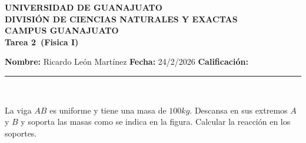 \documentclass[12pt,a4paper]{article}
\newcommand{\alumno}{Ricardo León Martínez}
\newcommand{\materia}{Fisica I}
\newcommand{\tarea}{Tarea 2}
\newcommand{\fecha}{24/2/2026}
\begin{document}
    \begin{center}
    {\large\textbf{UNIVERSIDAD DE GUANAJUATO}}\\[0.3cm]
    {\normalsize\textbf{DIVISIÓN DE CIENCIAS NATURALES Y EXACTAS}}\\
    {\normalsize\textbf{CAMPUS GUANAJUATO}}\\[1cm]

    {\Large\textbf{\tarea\ (\materia)}}\\[1cm]
    \end{center}

    \textbf{Nombre:} \alumno \hfill 
    \textbf{Fecha:} \fecha \hfill 
    \textbf{Calificación:} \rule{3cm}{0.4pt} \\[0.3cm]

    \begin{mdframed}[style=mdbluebox,frametitle={Ejercicio 1}]
        La viga $AB$ es uniforme y tiene una masa de $100kg$. Descansa en sus extremos $A$ y $B$
        y soporta las masas como se indica en la figura. Calcular la reacción en los soportes.
    \end{mdframed}
\end{document}

